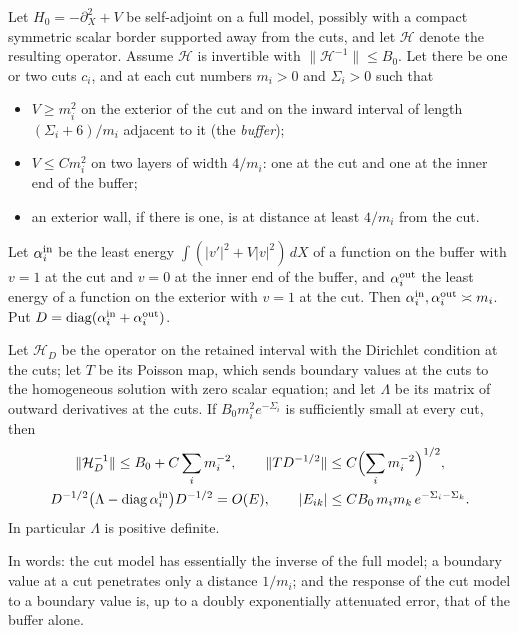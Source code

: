 \begin{lemma}\label{lem:fence-compression}
Let $H_0=-\partial_X^2+V$ be self-adjoint on a full model, possibly
with a compact symmetric scalar border supported away from the cuts,
and let $\mathcal H$ denote the resulting operator. Assume
$\mathcal H$ is invertible with $\|\mathcal H^{-1}\|\le B_0$. Let
there be one or two cuts $c_i$, and at each cut numbers $m_i>0$ and
$\Sigma_i>0$ such that
\begin{itemize}
\item $V\ge m_i^2$ on the exterior of the cut and on the inward
 interval of length $(\Sigma_i+6)/m_i$ adjacent to it (the
 \emph{buffer});
\item $V\le Cm_i^2$ on two layers of width $4/m_i$: one at the cut and
 one at the inner end of the buffer;
\item an exterior wall, if there is one, is at distance at least
 $4/m_i$ from the cut.
\end{itemize}
Let $\alpha_i^{\rm in}$ be the least energy
$\int(|v'|^2+V|v|^2)\,dX$ of a function on the buffer with $v=1$ at
the cut and $v=0$ at the inner end of the buffer, and
$\alpha_i^{\rm out}$ the least energy of a function on the exterior
with $v=1$ at the cut. Then
$\alpha_i^{\rm in},\alpha_i^{\rm out}\asymp m_i$. Put
$D=\operatorname{diag}(\alpha_i^{\rm in}+\alpha_i^{\rm out})$.

Let $\mathcal H_D$ be the operator on the retained interval with the
Dirichlet condition at the cuts; let $T$ be its Poisson map, which
sends boundary values at the cuts to the homogeneous solution with
zero scalar equation; and let $\Lambda$ be its matrix of outward
derivatives at the cuts. If $B_0m_i^2e^{-\Sigma_i}$ is sufficiently
small at every cut, then
\begin{equation}\label{eq:buffer-estimates-new}
 \begin{gathered}
 \|\mathcal H_D^{-1}\|\le B_0+C\sum_i m_i^{-2},\qquad
 \|TD^{-1/2}\|\le C\Bigl(\sum_i m_i^{-2}\Bigr)^{1/2},\\
 D^{-1/2}\bigl(\Lambda-\operatorname{diag}\alpha_i^{\rm in}\bigr)D^{-1/2}
       =O(E),\qquad
 |E_{ik}|\le CB_0\,m_im_k\,e^{-\Sigma_i-\Sigma_k}.
 \end{gathered}
\end{equation}
In particular $\Lambda$ is positive definite.
\end{lemma}

In words: the cut model has essentially the inverse of the full model;
a boundary value at a cut penetrates only a distance $1/m_i$; and the
response of the cut model to a boundary value is, up to a doubly
exponentially attenuated error, that of the buffer alone.

